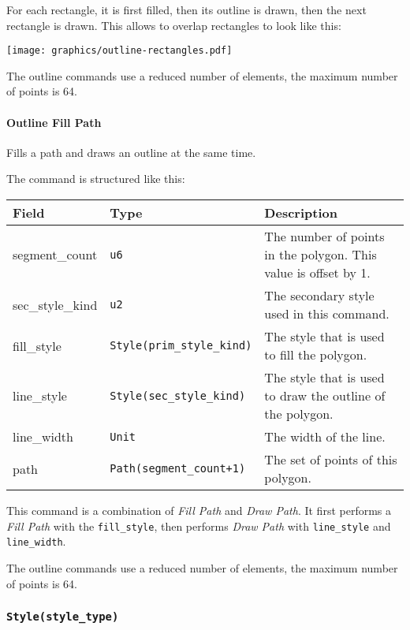 \documentclass[]{article}
\begin{document}
For each rectangle, it is first filled, then its outline is drawn, then
the next rectangle is drawn. This allows to overlap rectangles to look
like this:

\begin{center}
\texttt{[image: graphics/outline-rectangles.pdf]}
\end{center}

The outline commands use a reduced number of elements, the maximum
number of points is 64.

\hypertarget{outline-fill-path}{\paragraph{Outline Fill Path}\label{outline-fill-path}}

Fills a path and draws an outline at the same time.

The command is structured like this:

\begin{longtable}[]{@{}p{1in}p{1.6in}p{3.4in}@{}}
\toprule
Field & Type & Description \\
\midrule
\endhead
segment\_count & \texttt{u6} & The number of points in the polygon. This value is offset by 1. \\
sec\_style\_kind & \texttt{u2} & The secondary style used in this command. \\
fill\_style & \texttt{Style(prim\_style\_kind)} & The style that is used to fill the polygon. \\
line\_style & \texttt{Style(sec\_style\_kind)} & The style that is used to draw the outline of the polygon. \\
line\_width & \texttt{Unit} & The width of the line. \\ path & \texttt{Path(segment\_count+1)} & The set of points of this polygon. \\
\bottomrule
\end{longtable}

This command is a combination of \emph{Fill Path} and \emph{Draw Path}.
It first performs a \emph{Fill Path} with the \texttt{fill\_style}, then
performs \emph{Draw Path} with \texttt{line\_style} and
\texttt{line\_width}.

The outline commands use a reduced number of elements, the maximum
number of points is 64.

\hypertarget{stylestyle_type}{\subsubsection{\texorpdfstring{\texttt{Style(style\_type)}}{Style(style\_type)}}\label{stylestyle_type}}
\end{document}
